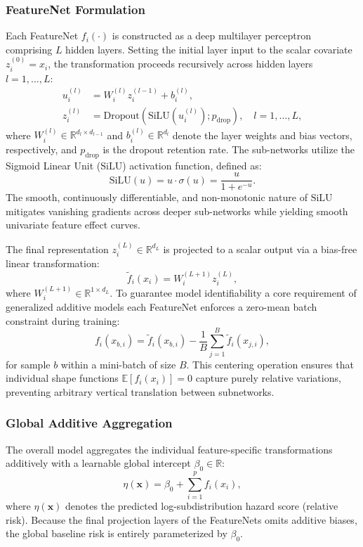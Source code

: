 \documentclass[a4paper,twoside,12pt]{report}
\begin{document}
\subsubsection{FeatureNet Formulation}
Each FeatureNet $f_i(\cdot)$ is constructed as a deep multilayer perceptron comprising $L$ hidden layers. Setting the initial layer input to the scalar covariate $z_i^{(0)} = x_i$, the transformation proceeds recursively across hidden layers $l = 1, \dots, L$:
\begin{align}
    u_i^{(l)} &= W_i^{(l)} z_i^{(l-1)} + b_i^{(l)}, \\
    z_i^{(l)} &= \text{Dropout}\left( \text{SiLU}\left(u_i^{(l)}\right); p_{\text{drop}} \right), \quad l = 1, \dots, L,
\end{align}
where $W_i^{(l)} \in \mathbb{R}^{d_l \times d_{l-1}}$ and $b_i^{(l)} \in \mathbb{R}^{d_l}$ denote the layer weights and bias vectors, respectively, and $p_{\text{drop}}$ is the dropout retention rate. The sub-networks utilize the Sigmoid Linear Unit ($\text{SiLU}$) activation function, defined as:
\begin{equation}
    \text{SiLU}(u) = u \cdot \sigma(u) = \frac{u}{1 + e^{-u}}.
\end{equation}
The smooth, continuously differentiable, and non-monotonic nature of $\text{SiLU}$ mitigates vanishing gradients across deeper sub-networks while yielding smooth univariate feature effect curves.

The final representation $z_i^{(L)} \in \mathbb{R}^{d_L}$ is projected to a scalar output via a bias-free linear transformation:
\begin{equation}
    \tilde{f}_i(x_i) = W_i^{(L+1)} z_i^{(L)},
\end{equation}
where $W_i^{(L+1)} \in \mathbb{R}^{1 \times d_L}$. To guarantee model identifiability a core requirement of generalized additive models each FeatureNet enforces a zero-mean batch constraint during training:
\begin{equation}
    f_i(x_{b,i}) = \tilde{f}_i(x_{b,i}) - \frac{1}{B} \sum_{j=1}^B \tilde{f}_i(x_{j,i}),
\end{equation}
for sample $b$ within a mini-batch of size $B$. This centering operation ensures that individual shape functions $\mathbb{E}[f_i(x_i)] = 0$ capture purely relative variations, preventing arbitrary vertical translation between subnetworks.

\subsubsection{Global Additive Aggregation}
The overall model aggregates the individual feature-specific transformations additively with a learnable global intercept $\beta_0 \in \mathbb{R}$:
\begin{equation}
    \eta(\mathbf{x}) = \beta_0 + \sum_{i=1}^p f_i(x_i),
\end{equation}
where $\eta(\mathbf{x})$ denotes the predicted log-subdistribution hazard score (relative risk). Because the final projection layers of the FeatureNets omits additive biases, the global baseline risk is entirely parameterized by $\beta_0$.
\end{document}
